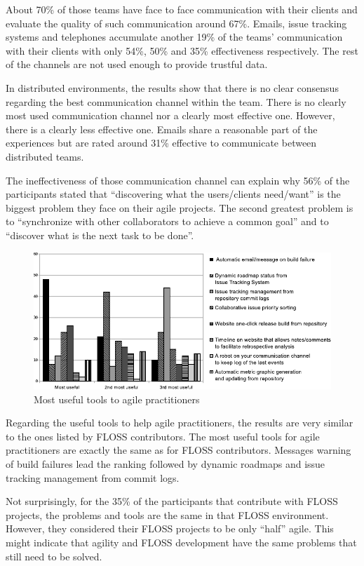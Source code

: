 \documentclass[lnbip]{svmultln}
\begin{document}
About 70\% of those teams have face to face communication with their
clients and evaluate the quality of such communication around
67\%. Emails, issue tracking systems and telephones accumulate another
19\% of the teams' communication with their clients with only 54\%,
50\% and 35\% effectiveness respectively. The rest of the channels are
not used enough to provide trustful data.

In distributed environments, the results show that there is no clear
consensus regarding the best communication channel within the
team. There is no clearly most used communication channel nor a
clearly most effective one. However, there is a clearly less effective
one. Emails share a reasonable part of the experiences but are rated
around 31\% effective to communicate between distributed teams.

The ineffectiveness of those communication channel can explain why
56\% of the participants stated that ``discovering what the
users/clients need/want'' is the biggest problem they face on their
agile projects. The second greatest problem is to ``synchronize with
other collaborators to achieve a common goal'' and to ``discover what
is the next task to be done''.

\begin{figure}[hbt]
  \centering
  \includegraphics[scale=.9]{agile-tools.pdf}
  \caption{Most useful tools to agile practitioners}
  \label{fig:agile-tools}
\end{figure}

Regarding the useful tools to help agile practitioners, the results
are very similar to the ones listed by FLOSS contributors. The most
useful tools for agile practitioners are exactly the same as for FLOSS
contributors. Messages warning of build failures lead the ranking
followed by dynamic roadmaps and issue tracking management from commit
logs.

Not surprisingly, for the 35\% of the participants that contribute
with FLOSS projects, the problems and tools are the same in that FLOSS
environment. However, they considered their FLOSS projects to be only
``half'' agile. This might indicate that agility and FLOSS development
have the same problems that still need to be solved.
\end{document}
